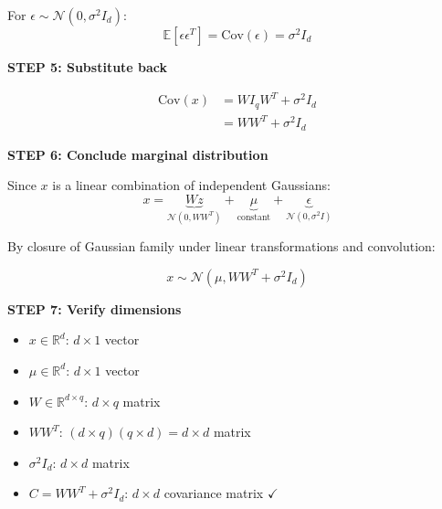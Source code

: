 \documentclass[12pt]{article}
\begin{document}
\begin{solution}
For $\epsilon \sim \mathcal{N}(0, \sigma^2 I_d)$:
\[
\mathbb{E}[\epsilon\epsilon^T] = \text{Cov}(\epsilon) = \sigma^2 I_d
\]

\textbf{STEP 5: Substitute back}

\begin{align*}
\text{Cov}(x) &= W I_q W^T + \sigma^2 I_d \\
&= WW^T + \sigma^2 I_d
\end{align*}

\textbf{STEP 6: Conclude marginal distribution}

Since $x$ is a linear combination of independent Gaussians:
\[
x = \underbrace{Wz}_{\mathcal{N}(0, WW^T)} + \underbrace{\mu}_{\text{constant}} + \underbrace{\epsilon}_{\mathcal{N}(0, \sigma^2I)}
\]

By closure of Gaussian family under linear transformations and convolution:

\[
\boxed{x \sim \mathcal{N}(\mu, WW^T + \sigma^2 I_d)}
\]

\textbf{STEP 7: Verify dimensions}

\begin{itemize}
    \item $x \in \mathbb{R}^d$: $d \times 1$ vector
    \item $\mu \in \mathbb{R}^d$: $d \times 1$ vector
    \item $W \in \mathbb{R}^{d \times q}$: $d \times q$ matrix
    \item $WW^T$: $(d \times q)(q \times d) = d \times d$ matrix
    \item $\sigma^2 I_d$: $d \times d$ matrix
    \item $C = WW^T + \sigma^2 I_d$: $d \times d$ covariance matrix $\checkmark$
\end{itemize}

\end{solution}
\end{document}
